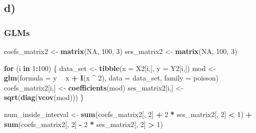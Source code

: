 \documentclass[]{article}
\newenvironment{Shaded}{\begin{snugshade}}{\end{snugshade}}
\newcommand{\ControlFlowTok}[1]{\textcolor[rgb]{0.13,0.29,0.53}{\textbf{#1}}}
\newcommand{\DataTypeTok}[1]{\textcolor[rgb]{0.13,0.29,0.53}{#1}}
\newcommand{\DecValTok}[1]{\textcolor[rgb]{0.00,0.00,0.81}{#1}}
\newcommand{\KeywordTok}[1]{\textcolor[rgb]{0.13,0.29,0.53}{\textbf{#1}}}
\newcommand{\NormalTok}[1]{#1}
\newcommand{\OperatorTok}[1]{\textcolor[rgb]{0.81,0.36,0.00}{\textbf{#1}}}
\newcommand{\OtherTok}[1]{\textcolor[rgb]{0.56,0.35,0.01}{#1}}
\newcommand{\StringTok}[1]{\textcolor[rgb]{0.31,0.60,0.02}{#1}}
\begin{document}
\hypertarget{d}{%
\subsection{d)}\label{d}}

\hypertarget{glms}{%
\subsubsection{GLMs}\label{glms}}

\begin{Shaded}
\begin{Highlighting}[]
\NormalTok{coefs_matrix2 <-}\StringTok{ }\KeywordTok{matrix}\NormalTok{(}\OtherTok{NA}\NormalTok{, }\DecValTok{100}\NormalTok{, }\DecValTok{3}\NormalTok{)}
\NormalTok{ses_matrix2 <-}\StringTok{ }\KeywordTok{matrix}\NormalTok{(}\OtherTok{NA}\NormalTok{, }\DecValTok{100}\NormalTok{, }\DecValTok{3}\NormalTok{)}


\ControlFlowTok{for}\NormalTok{ (i }\ControlFlowTok{in} \DecValTok{1}\OperatorTok{:}\DecValTok{100}\NormalTok{) \{}
\NormalTok{    data_set <-}\StringTok{ }\KeywordTok{tibble}\NormalTok{(}\DataTypeTok{x =}\NormalTok{ X2[i,], }\DataTypeTok{y =}\NormalTok{ Y2[i,])}
\NormalTok{    mod <-}\StringTok{ }\KeywordTok{glm}\NormalTok{(}\DataTypeTok{formula =}\NormalTok{ y }\OperatorTok{~}\StringTok{ }\NormalTok{x }\OperatorTok{+}\StringTok{ }\KeywordTok{I}\NormalTok{(x }\OperatorTok{^}\StringTok{ }\DecValTok{2}\NormalTok{),}
               \DataTypeTok{data =}\NormalTok{ data_set,}
               \DataTypeTok{family =}\NormalTok{ poisson)}
\NormalTok{    coefs_matrix2[i,] <-}\StringTok{ }\KeywordTok{coefficients}\NormalTok{(mod)}
\NormalTok{    ses_matrix2[i,] <-}\StringTok{ }\KeywordTok{sqrt}\NormalTok{(}\KeywordTok{diag}\NormalTok{(}\KeywordTok{vcov}\NormalTok{(mod)))}
\NormalTok{\}}

\NormalTok{num_inside_interval <-}
\StringTok{    }\KeywordTok{sum}\NormalTok{(coefs_matrix2[, }\DecValTok{2}\NormalTok{] }\OperatorTok{+}\StringTok{ }\DecValTok{2} \OperatorTok{*}\StringTok{ }\NormalTok{ses_matrix2[, }\DecValTok{2}\NormalTok{] }\OperatorTok{<}\StringTok{ }\DecValTok{1}\NormalTok{) }\OperatorTok{+}\StringTok{ }\KeywordTok{sum}\NormalTok{(coefs_matrix2[, }\DecValTok{2}\NormalTok{] }\OperatorTok{-}\StringTok{ }\DecValTok{2} \OperatorTok{*}\StringTok{ }\NormalTok{ses_matrix2[, }\DecValTok{2}\NormalTok{] }\OperatorTok{>}\StringTok{ }\DecValTok{1}\NormalTok{)}
\end{Highlighting}
\end{Shaded}
\end{document}
